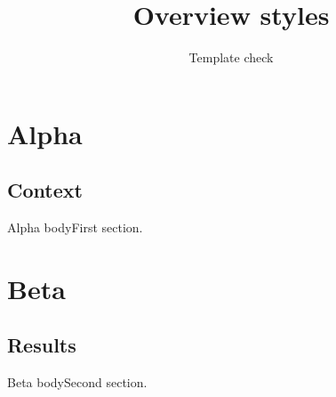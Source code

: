 \documentclass[language=english,cjk=false]{campusbeamer}
\title{Overview styles}
\author{Template check}
\begin{document}
\sectiontocpage[overview]
\section{Alpha}
\subsection{Context}
\begin{frame}{Alpha body}First section.\end{frame}
\sectiontocpage
\sectiontocpage[overview]
\section{Beta}
\subsection{Results}
\begin{frame}{Beta body}Second section.\end{frame}
\sectiontocpage[overview]
\sectiontocpage[current]
\end{document}
